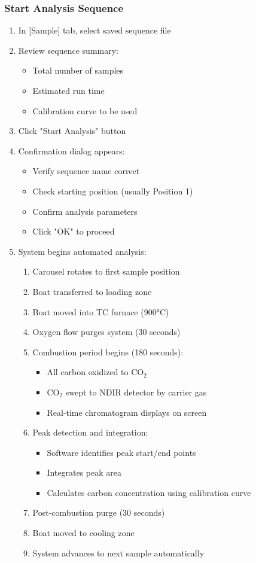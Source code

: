 \documentclass[11pt,a4paper]{article}\usepackage[]{graphicx}\usepackage[]{xcolor}
\begin{document}
\subsubsection{Start Analysis Sequence}
\begin{enumerate}[noitemsep]
    \item In [Sample] tab, select saved sequence file
    \item Review sequence summary:
    \begin{itemize}
        \item Total number of samples
        \item Estimated run time
        \item Calibration curve to be used
    \end{itemize}
    \item Click "Start Analysis" button
    \item Confirmation dialog appears:
    \begin{itemize}
        \item Verify sequence name correct
        \item Check starting position (usually Position 1)
        \item Confirm analysis parameters
        \item Click "OK" to proceed
    \end{itemize}
    \item System begins automated analysis:
    \begin{enumerate}
        \item Carousel rotates to first sample position
        \item Boat transferred to loading zone
        \item Boat moved into TC furnace (900°C)
        \item Oxygen flow purges system (30 seconds)
        \item Combustion period begins (180 seconds):
        \begin{itemize}
            \item All carbon oxidized to CO$_2$
            \item CO$_2$ swept to NDIR detector by carrier gas
            \item Real-time chromatogram displays on screen
        \end{itemize}
        \item Peak detection and integration:
        \begin{itemize}
            \item Software identifies peak start/end points
            \item Integrates peak area
            \item Calculates carbon concentration using calibration curve
        \end{itemize}
        \item Post-combustion purge (30 seconds)
        \item Boat moved to cooling zone
        \item System advances to next sample automatically
    \end{enumerate}
\end{enumerate}
\end{document}
